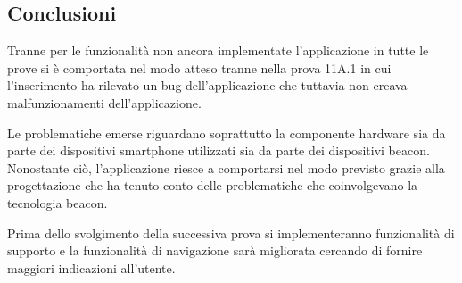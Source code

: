 \documentclass[../Sperimentazione.tex]{subfiles}
\begin{document}
		\newpage
		\subsection{Conclusioni}
			Tranne per le funzionalità non ancora implementate l'applicazione in tutte le prove si è comportata nel modo atteso tranne nella prova 11A.1 in cui l'inserimento ha rilevato un bug  dell'applicazione che tuttavia non creava malfunzionamenti dell'applicazione. 
			
			Le problematiche emerse riguardano soprattutto la componente hardware sia da parte dei dispositivi smartphone utilizzati sia da parte dei dispositivi beacon. Nonostante ciò, l'applicazione riesce a comportarsi nel modo previsto grazie alla progettazione che ha tenuto conto delle problematiche che coinvolgevano la tecnologia beacon. 
			
			Prima dello svolgimento della successiva prova si implementeranno funzionalità di supporto e la funzionalità di navigazione sarà migliorata cercando di fornire maggiori indicazioni all'utente. 
\end{document}
